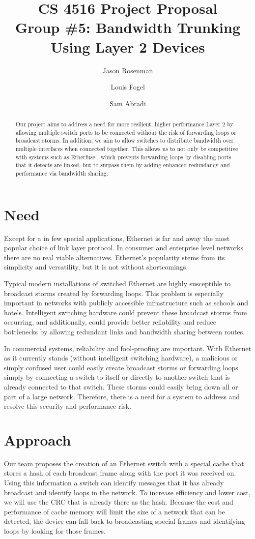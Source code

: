 \documentclass{article}
\title{CS 4516 Project Proposal\\Group \#5: Bandwidth Trunking Using Layer 2 Devices}
\author{Jason Rosenman \and Louis Fogel \and Sam Abradi}
\date{}
\begin{document}
\maketitle
\begin{abstract}
	Our project aims to address a need for more resilient, higher performance Layer 2 by allowing multiple switch ports to be connected without the risk of forwarding loops or broadcast storms.
	In addition, we aim to allow switches to distribute bandwidth over multiple interfaces when connected together.
	This allows us to not only be competitive with systems such as Etherfuse \cite{etherfuse}, which prevents forwarding loops by disabling ports that it detects are linked, but to surpass them by adding enhanced redundancy and performance via bandwidth sharing.
\end{abstract}
\section{Need}
	Except for a in few special applications, Ethernet is far and away the most popular choice of link layer protocol.
	In consumer and enterprise level networks there are no real viable alternatives.
	Ethernet’s popularity stems from its simplicity and versatility, but it is not without shortcomings.

	Typical modern installations of switched Ethernet are highly susceptible to broadcast storms created by forwarding loops.
	This problem is especially important in networks with publicly accessible infrastructure such as schools and hotels.
	Intelligent switching hardware could prevent these broadcast storms from occurring, and additionally, could provide better reliability and reduce bottlenecks by allowing redundant links and bandwidth sharing between routes.
	
	In commercial systems, reliability and fool-proofing are important.
	With Ethernet as it currently stands (without intelligent switching hardware), a malicious or simply confused user could easily create broadcast storms or forwarding loops simply by connecting a switch to itself or directly to another switch that is already connected to that switch.
	These storms could easily bring down all or part of a large network.
	Therefore, there is a need for a system to address and resolve this security and performance risk.
\section{Approach}
	Our team proposes the creation of an Ethernet switch with a special cache that stores a hash of each broadcast frame along with the port it was received on.
	Using this information a switch can identify messages that it has already broadcast and identify loops in the network.
        To increase efficiency and lower cost, we will use the CRC that is already there as the hash.
	Because the cost and performance of cache memory will limit the size of a network that can be detected, the device can fall back to broadcasting special frames and identifying loops by looking for those frames.
\end{document}
